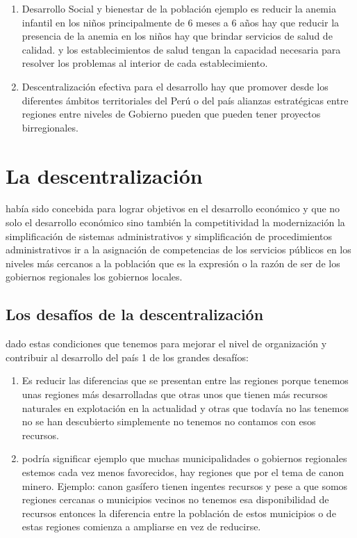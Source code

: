 \documentclass[
  jou,
  floatsintext,
  longtable,
  a4paper,
  nolmodern,
  notxfonts,
  notimes,
  12pt,
  colorlinks=true,linkcolor=blue,citecolor=blue,urlcolor=blue]{apa7}
\begin{document}
\begin{enumerate}
\def\labelenumi{\arabic{enumi}.}
\setcounter{enumi}{3}
\item
  Desarrollo Social y bienestar de la población ejemplo es reducir la
  anemia infantil en los niños principalmente de 6 meses a 6 años hay
  que reducir la presencia de la anemia en los niños hay que brindar
  servicios de salud de calidad. y los establecimientos de salud tengan
  la capacidad necesaria para resolver los problemas al interior de cada
  establecimiento.
\item
  Descentralización efectiva para el desarrollo hay que promover desde
  los diferentes ámbitos territoriales del Perú o del país alianzas
  estratégicas entre regiones entre niveles de Gobierno pueden que
  pueden tener proyectos birregionales.
\end{enumerate}

\section{La descentralización}\label{la-descentralizaciuxf3n}

había sido concebida para lograr objetivos en el desarrollo económico y
que no solo el desarrollo económico sino también la competitividad la
modernización la simplificación de sistemas administrativos y
simplificación de procedimientos administrativos ir a la asignación de
competencias de los servicios públicos en los niveles más cercanos a la
población que es la expresión o la razón de ser de los gobiernos
regionales los gobiernos locales.

\subsection{Los desafíos de la
descentralización}\label{los-desafuxedos-de-la-descentralizaciuxf3n}

dado estas condiciones que tenemos para mejorar el nivel de organización
y contribuir al desarrollo del país 1 de los grandes desafíos:

\begin{enumerate}
\def\labelenumi{\arabic{enumi}.}
\item
  Es reducir las diferencias que se presentan entre las regiones porque
  tenemos unas regiones más desarrolladas que otras unos que tienen más
  recursos naturales en explotación en la actualidad y otras que todavía
  no las tenemos no se han descubierto simplemente no tenemos no
  contamos con esos recursos.
\item
  podría significar ejemplo que muchas municipalidades o gobiernos
  regionales estemos cada vez menos favorecidos, hay regiones que por el
  tema de canon minero. Ejemplo: canon gasífero tienen ingentes recursos
  y pese a que somos regiones cercanas o municipios vecinos no tenemos
  esa disponibilidad de recursos entonces la diferencia entre la
  población de estos municipios o de estas regiones comienza a ampliarse
  en vez de reducirse.
\end{enumerate}
\end{document}
